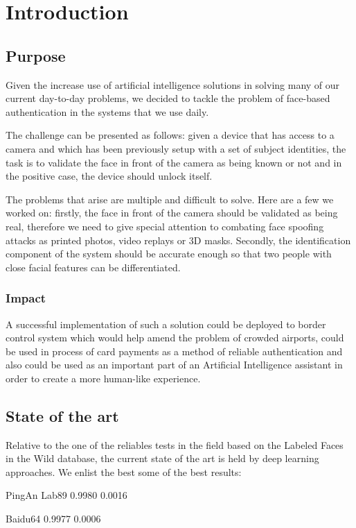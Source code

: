 \chapter{Introduction}

\section{Purpose}

Given the increase use of artificial intelligence solutions in solving many of our current day-to-day problems, we decided to tackle the problem of face-based authentication in the systems that we use daily.

The challenge can be presented as follows: given a device that has access to a camera and which has been previously setup with a set of subject identities, the task is to validate the face in front of the camera as being known or not and in the positive case, the device should unlock itself.

The problems that arise are multiple and difficult to solve. Here are a few we worked on: firstly, the face in front of the camera should be validated as being real, therefore we need to give special attention to combating face spoofing attacks as printed photos, video replays or 3D masks. Secondly, the identification component of the system should be accurate enough so that two people with close facial features can be differentiated.

\subsection{Impact}
A successful implementation of such a solution could be deployed to border control system which would help amend the problem of crowded airports, could be used in process of card payments as a method of reliable authentication and also could be used as an important part of an Artificial Intelligence assistant in order to create a more human-like experience.

\section{State of the art}
Relative to the one of the reliables tests in the field based on the Labeled Faces in the Wild database, the current state of the art is held by deep learning approaches. We enlist the best some of the best results:

PingAn Lab89 0.9980 0.0016

Baidu64 0.9977 0.0006

